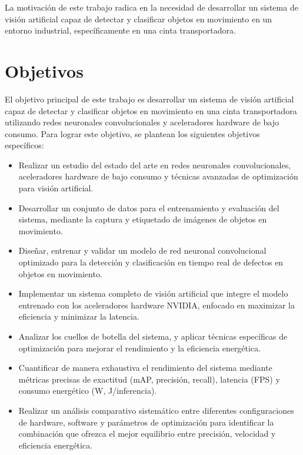 \documentclass[11pt,spanish,listoffigures,listoftables]{tfgetsinf}
\begin{document}
La motivación de este trabajo radica en la necesidad de desarrollar un sistema de visión artificial capaz de detectar y clasificar objetos en movimiento en un entorno industrial, específicamente en una cinta transportadora.


\section{Objetivos} \label{sec:objetivos}

El objetivo principal de este trabajo es desarrollar un sistema de visión artificial capaz de detectar y clasificar objetos en movimiento en una cinta transportadora utilizando redes neuronales convolucionales y aceleradores hardware de bajo consumo. Para lograr este objetivo, se plantean los siguientes objetivos específicos:

\begin{itemize}
   \item Realizar un estudio del estado del arte en redes neuronales convolucionales, aceleradores hardware de bajo consumo y técnicas avanzadas de optimización para visión artificial.
   \item Desarrollar un conjunto de datos para el entrenamiento y evaluación del sistema, mediante la captura y etiquetado de imágenes de objetos en movimiento.
   \item Diseñar, entrenar y validar un modelo de red neuronal convolucional optimizado para la detección y clasificación en tiempo real de defectos en objetos en movimiento.
   \item Implementar un sistema completo de visión artificial que integre el modelo entrenado con los aceleradores hardware NVIDIA, enfocado en maximizar la eficiencia y minimizar la latencia.
   \item Analizar los cuellos de botella del sistema, y aplicar técnicas específicas de optimización para mejorar el rendimiento y la eficiencia energética.
   \item Cuantificar de manera exhaustiva el rendimiento del sistema mediante métricas precisas de exactitud (mAP, precisión, recall), latencia (FPS) y consumo energético (W, J/inferencia).
   \item Realizar un análisis comparativo sistemático entre diferentes configuraciones de hardware, software y parámetros de optimización para identificar la combinación que ofrezca el mejor equilibrio entre precisión, velocidad y eficiencia energética.
\end{itemize}
\end{document}
